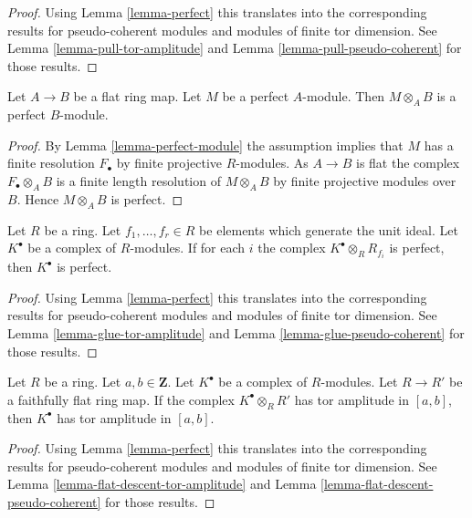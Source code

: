 \begin{proof}
Using
Lemma \ref{lemma-perfect}
this translates into the corresponding results for pseudo-coherent modules
and modules of finite tor dimension. See
Lemma \ref{lemma-pull-tor-amplitude}
and
Lemma \ref{lemma-pull-pseudo-coherent}
for those results.
\end{proof}

\begin{lemma}
\label{lemma-flat-base-change-perfect}
Let $A \to B$ be a flat ring map. Let $M$ be a perfect $A$-module.
Then $M \otimes_A B$ is a perfect $B$-module.
\end{lemma}

\begin{proof}
By
Lemma \ref{lemma-perfect-module}
the assumption implies that $M$ has a finite resolution $F_\bullet$ by
finite projective $R$-modules. As $A \to B$ is flat the complex
$F_\bullet \otimes_A B$ is a finite length resolution of $M \otimes_A B$
by finite projective modules over $B$. Hence $M \otimes_A B$ is perfect.
\end{proof}

\begin{lemma}
\label{lemma-glue-perfect}
Let $R$ be a ring. Let $f_1, \ldots, f_r \in R$ be elements which
generate the unit ideal. Let $K^\bullet$
be a complex of $R$-modules. If for each $i$ the complex
$K^\bullet \otimes_R R_{f_i}$ is perfect,
then $K^\bullet$ is perfect.
\end{lemma}

\begin{proof}
Using
Lemma \ref{lemma-perfect}
this translates into the corresponding results for pseudo-coherent modules
and modules of finite tor dimension. See
Lemma \ref{lemma-glue-tor-amplitude}
and
Lemma \ref{lemma-glue-pseudo-coherent}
for those results.
\end{proof}

\begin{lemma}
\label{lemma-flat-descent-perfect}
Let $R$ be a ring. Let $a, b \in \mathbf{Z}$. Let $K^\bullet$
be a complex of $R$-modules. Let $R \to R'$ be a faithfully flat
ring map. If the complex $K^\bullet \otimes_R R'$ has tor amplitude
in $[a, b]$, then $K^\bullet$ has tor amplitude in $[a, b]$.
\end{lemma}

\begin{proof}
Using
Lemma \ref{lemma-perfect}
this translates into the corresponding results for pseudo-coherent modules
and modules of finite tor dimension. See
Lemma \ref{lemma-flat-descent-tor-amplitude}
and
Lemma \ref{lemma-flat-descent-pseudo-coherent}
for those results.
\end{proof}

